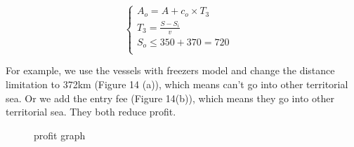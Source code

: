 \documentclass{mcmthesis}
\begin{document}
\begin{equation}
\left\{
\begin{array}{lr}
A_o=A+c_o \times T_3 &\\
T_3=\frac{S-S_i}{v} &\\
S_o \leq 350+370=720 \\
\end{array}
\right.
\end{equation}

For example, we use the vessels with freezers model and change the distance limitation to 372km (Figure 14 (a)), which means can't go into other territorial sea. Or we add the entry fee (Figure 14(b)), which means they go into other territorial sea. They both reduce profit.

\begin{figure}[htbp]
  \centering
  \centering
  \caption{profit graph}
\end{figure}
\end{document}
